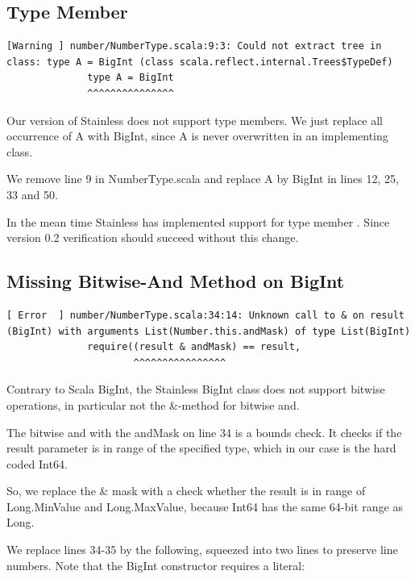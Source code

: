 \documentclass[runningheads]{llncs}
\begin{document}
\subsection{Type Member}

\begin{lstlisting}[style=stainless]
[Warning ] number/NumberType.scala:9:3: Could not extract tree in class: type A = BigInt (class scala.reflect.internal.Trees$TypeDef)
              type A = BigInt
              ^^^^^^^^^^^^^^^
\end{lstlisting}

Our version of Stainless does not support type members. We just
replace all occurrence of A with BigInt, since A is never overwritten
in an implementing class.

We remove line 9 in NumberType.scala and replace A by BigInt in lines
12, 25, 33 and 50.

In the mean time Stainless has implemented support for type member
\cite{Stainless:pull470}.  Since version 0.2 verification should
succeed without this change.



\subsection{Missing Bitwise-And Method on BigInt}

\begin{lstlisting}[style=stainless]
[ Error  ] number/NumberType.scala:34:14: Unknown call to & on result (BigInt) with arguments List(Number.this.andMask) of type List(BigInt)
              require((result & andMask) == result,
                      ^^^^^^^^^^^^^^^^
\end{lstlisting}

Contrary to Scala BigInt, the Stainless BigInt class does not support
bitwise operations, in particular not the \&-method for bitwise and.

The bitwise and with the andMask on line 34 is a bounds check.  It
checks if the result parameter is in range of the specified type,
which in our case is the hard coded Int64.

So, we replace the \& mask with a check whether the result
is in range of Long.MinValue and Long.MaxValue, because Int64 has the
same 64-bit range as Long.  

We replace lines 34-35 by the following, squeezed into two lines to
preserve line numbers. Note that the BigInt constructor requires a
literal:
\end{document}
